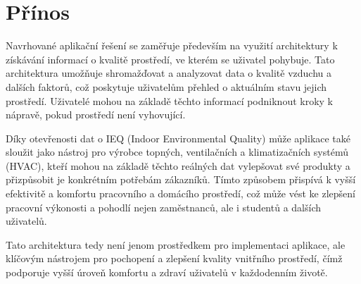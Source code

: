 \section*{Přínos}

Navrhované aplikační řešení se zaměřuje především na využití architektury k získávání informací o kvalitě prostředí, ve kterém se uživatel pohybuje. Tato architektura umožňuje shromažďovat a analyzovat data o kvalitě vzduchu a dalších faktorů, což poskytuje uživatelům přehled o aktuálním stavu jejich prostředí. Uživatelé mohou na základě těchto informací podniknout kroky k nápravě, pokud prostředí není vyhovující.

Díky otevřenosti dat o IEQ (Indoor Environmental Quality) může aplikace také sloužit jako nástroj pro výrobce topných, ventilačních a klimatizačních systémů (HVAC), kteří mohou na základě těchto reálných dat vylepšovat své produkty a přizpůsobit je konkrétním potřebám zákazníků. Tímto způsobem přispívá k vyšší efektivitě a komfortu pracovního a domácího prostředí, což může vést ke zlepšení pracovní výkonosti a pohodlí nejen zaměstnanců, ale i studentů a dalších uživatelů.

Tato architektura tedy není jenom prostředkem pro implementaci aplikace, ale klíčovým nástrojem pro pochopení a zlepšení kvality vnitřního prostředí, čímž podporuje vyšší úroveň komfortu a zdraví uživatelů v každodenním životě.